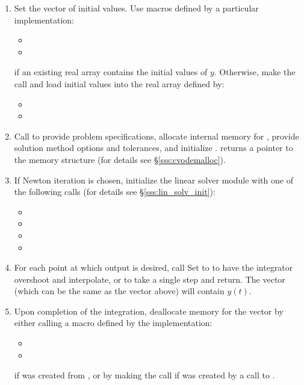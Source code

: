 \begin{enumerate}
\item Set the vector  of initial values.  Use macros
  defined by a particular {\nvector} implementation:
  \begin{itemize}
  \item {\s} 
  \item {\p} 
  \end{itemize}
  if an existing real array  contains the initial values of $y$.  
  Otherwise, make the call  and load 
  initial values into the real array defined by:
  \begin{itemize}
  \item {\s}
  \item {\p}
  \end{itemize}
  
\item\label{i:cvode_malloc} 
  Call  
  to provide problem specifications,
  allocate internal memory for {\cvodes}, 
  provide solution method options and tolerances, and initialize {\cvodes}. 
   returns a pointer to the {\cvodes} memory structure 
  (for details see \S\ref{sss:cvodemalloc}).
  
\item\label{i:lin_solver} If Newton iteration is chosen, initialize the linear solver module
  with one of the following calls (for details see \S\ref{sss:lin_solv_init}):
  \begin{itemize}
  \item {\s} 
  \item {\s} 
  \item {}
  \item {}
  \end{itemize}
  
\item 
  For each point at which output is desired, call
  Set  to  to have the integrator overshoot 
   and interpolate, or  to take a single 
  step and return. The vector  (which can be the same as
  the vector  above) will contain $y(t)$.
  
\item Upon completion of the integration, deallocate memory for the vector 
  by either calling a macro defined by the {\nvector} implementation:
  \begin{itemize}
  \item {\s} 
  \item {\p}
  \end{itemize}
  if  was created from , or by making the call 
   if  was created by a call to .
  

\end{enumerate}
